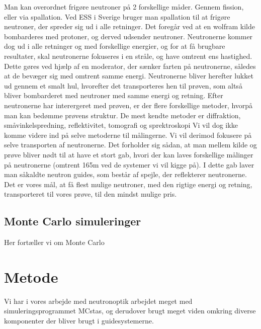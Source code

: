 \documentclass[12pt,oneside,a4paper]{article}
\begin{document}
{{{{{Man kan overordnet frigøre neutroner på 2 forskellige måder. Gennem fission, eller via spallation. Ved ESS i Sverige bruger man spallation til at frigøre neutroner, der spreder sig ud i alle retninger. Det foregår ved at en wolfram kilde bombarderes med protoner, og derved udsender neutroner. Neutronerne kommer dog ud i alle retninger og med forskellige energier, og for at få brugbare resultater, skal neutronerne fokuseres i en stråle, og have omtrent ens hastighed. Dette gøres ved hjælp af en moderator, der sænker farten på neutronerne, således at de bevæger sig med omtrent samme energi. Neutronerne bliver herefter lukket ud gennem et smalt hul, hvorefter det transporteres hen til prøven, som altså bliver bombarderet med neutroner med samme energi og retning. Efter neutronerne har interergeret med prøven, er der flere forskellige metoder, hvorpå man kan bedømme prøvens struktur. De mest kendte metoder er diffraktion, småvinkelspredning, reflektivitet, tomografi og sprektroskopi \cite{ess_folder}
Vi vil dog ikke komme videre ind på selve metoderne til målingerne. Vi vil derimod fokusere på selve transporten af neutronerne. Det forholder sig sådan, at man mellem kilde og prøve bliver nødt til at have et stort gab, hvori der kan laves forskellige målinger på neutronerne (omtrent 165m ved de systemer vi vil kigge på). I dette gab laver man såkaldte neutron guides, som består af spejle, der reflekterer neutronerne. Det er vores mål, at få flest mulige neutroner, med den rigtige energi og retning, transporteret til vores prøve, til den mindst mulige pris.


\subsection{Monte Carlo simuleringer}
Her fortæller vi om Monte Carlo 




\section{Metode}
Vi har i vores arbejde med neutronoptik arbejdet meget med simuleringsprogrammet MCstas, og derudover brugt meget viden omkring diverse komponenter der bliver brugt i guidesystemerne.

}}}}}
\end{document}
